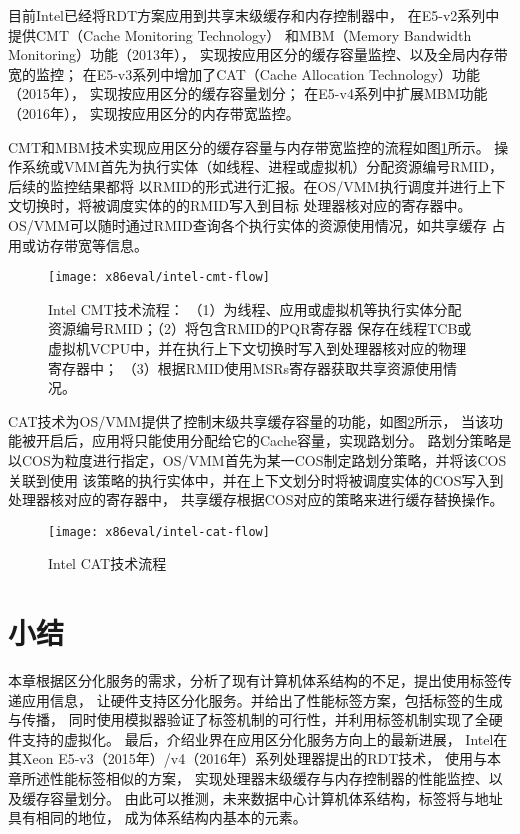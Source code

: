 目前Intel已经将RDT方案应用到共享末级缓存和内存控制器中，
在E5-v2系列中提供CMT（Cache Monitoring Technology）
和MBM（Memory Bandwidth Monitoring）功能（2013年），
实现按应用区分的缓存容量监控、以及全局内存带宽的监控；
在E5-v3系列中增加了CAT（Cache Allocation Technology）功能（2015年），
实现按应用区分的缓存容量划分；
在E5-v4系列中扩展MBM功能（2016年），
实现按应用区分的内存带宽监控。

CMT和MBM技术实现应用区分的缓存容量与内存带宽监控的流程如图\ref{fig:intel-cmt-flow}所示。
操作系统或VMM首先为执行实体（如线程、进程或虚拟机）分配资源编号RMID，后续的监控结果都将
以RMID的形式进行汇报。在OS/VMM执行调度并进行上下文切换时，将被调度实体的的RMID写入到目标
处理器核对应的寄存器中。OS/VMM可以随时通过RMID查询各个执行实体的资源使用情况，如共享缓存
占用或访存带宽等信息。

\begin{figure}[H]
  \centering
  \texttt{[image: x86eval/intel-cmt-flow]}
  \caption[Intel Cache Monitor Technology (CMT) 技术流程]{Intel CMT技术流程：
   （1）为线程、应用或虚拟机等执行实体分配资源编号RMID；（2）将包含RMID的PQR寄存器
   保存在线程TCB或虚拟机VCPU中，并在执行上下文切换时写入到处理器核对应的物理寄存器中；
   （3）根据RMID使用MSRs寄存器获取共享资源使用情况。}
  \label{fig:intel-cmt-flow}
\end{figure}

CAT技术为OS/VMM提供了控制末级共享缓存容量的功能，如图\ref{fig:intel-cat-flow}所示，
当该功能被开启后，应用将只能使用分配给它的Cache容量，实现路划分。
路划分策略是以COS为粒度进行指定，OS/VMM首先为某一COS制定路划分策略，并将该COS关联到使用
该策略的执行实体中，并在上下文划分时将被调度实体的COS写入到处理器核对应的寄存器中，
共享缓存根据COS对应的策略来进行缓存替换操作。

\begin{figure}[H]
  \centering
  \texttt{[image: x86eval/intel-cat-flow]}
  \caption[Intel Cache Allocation Technology (CAT) 技术流程]{Intel CAT技术流程}
  \label{fig:intel-cat-flow}
\end{figure}


\section{小结}

本章根据区分化服务的需求，分析了现有计算机体系结构的不足，提出使用标签传递应用信息，
让硬件支持区分化服务。并给出了性能标签方案，包括标签的生成与传播，
同时使用模拟器验证了标签机制的可行性，并利用标签机制实现了全硬件支持的虚拟化。
最后，介绍业界在应用区分化服务方向上的最新进展，
Intel在其Xeon E5-v3（2015年）/v4（2016年）系列处理器提出的RDT技术，
使用与本章所述性能标签相似的方案，
实现处理器末级缓存与内存控制器的性能监控、以及缓存容量划分。
由此可以推测，未来数据中心计算机体系结构，标签将与地址具有相同的地位，
成为体系结构内基本的元素。

